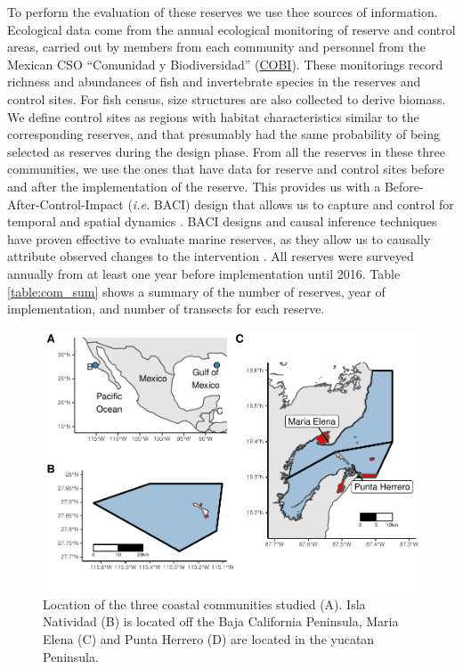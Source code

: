 \documentclass{frontiersSCNS}
\theoremstyle{definition}
\theoremstyle{definition}
\theoremstyle{definition}
\theoremstyle{remark}
\begin{document}
To perform the evaluation of these reserves we use thee sources of
information. Ecological data come from the annual ecological monitoring
of reserve and control areas, carried out by members from each community
and personnel from the Mexican CSO ``Comunidad y Biodiversidad''
(\href{www.cobi.org.mx}{COBI}). These monitorings record richness and
abundances of fish and invertebrate species in the reserves and control
sites. For fish census, size structures are also collected to derive
biomass. We define control sites as regions with habitat characteristics
similar to the corresponding reserves, and that presumably had the same
probability of being selected as reserves during the design phase. From
all the reserves in these three communities, we use the ones that have
data for reserve and control sites before and after the implementation
of the reserve. This provides us with a Before-After-Control-Impact
(\emph{i.e.} BACI) design that allows us to capture and control for
temporal and spatial dynamics \citep{depalma_2018,ferraro_2006-oW}. BACI
designs and causal inference techniques have proven effective to
evaluate marine reserves, as they allow us to causally attribute
observed changes to the intervention
\citep{moland_2013-VP,Villasenor-Derbez_2018}. All reserves were
surveyed annually from at least one year before implementation until
2016. Table \ref{table:com_sum} shows a summary of the number of
reserves, year of implementation, and number of transects for each
reserve.

\begin{figure}
\centering
\includegraphics{Villasenor-Derbez_files/figure-latex/unnamed-chunk-1-1.pdf}
\caption{\label{fig:unnamed-chunk-1}\label{fig:map}Location of the three
coastal communities studied (A). Isla Natividad (B) is located off the
Baja California Peninsula, Maria Elena (C) and Punta Herrero (D) are
located in the yucatan Peninsula.}
\end{figure}
\end{document}
